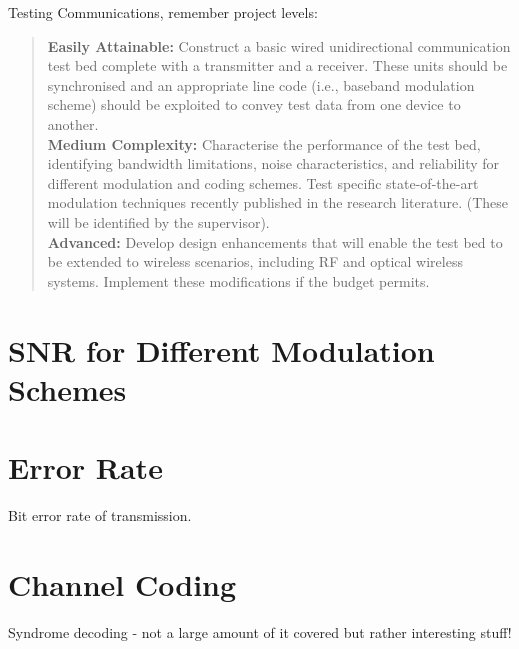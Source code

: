 \documentclass[../main.tex]{subfiles}
\begin{document}

Testing Communications, remember project levels:\\

\begin{quotation}
	\textbf{Easily Attainable:}
	Construct a basic wired unidirectional communication test bed complete with a transmitter and a receiver.
	These units should be synchronised and an appropriate line code (i.e., baseband modulation scheme) should be exploited to convey test data from one device to another.\\
	
	\textbf{Medium Complexity:}
	Characterise the performance of the test bed, identifying bandwidth limitations, noise characteristics, and reliability for different modulation and coding schemes. Test specific state-of-the-art modulation techniques recently published in the research literature. (These will be identified by the supervisor).\\
	
	\textbf{Advanced:}
	Develop design enhancements that will enable the test bed to be extended to wireless scenarios, including RF and optical wireless systems.
	Implement these modifications if the budget permits.
\end{quotation}



\section{SNR for Different Modulation Schemes}



\section{Error Rate}

Bit error rate of transmission.


\section{Channel Coding} \label{sec_Channel Coding}

Syndrome decoding - not a large amount of it covered but rather interesting stuff!
\end{document}
